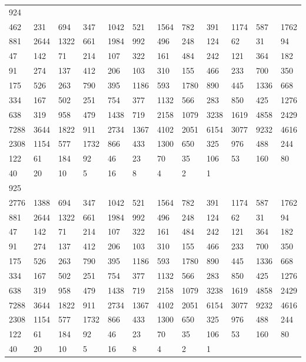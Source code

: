 \begin{longtable}{llllllllllll}
924&&&&&&&&&&&\\
462& 231& 694& 347& 1042& 521& 1564& 782& 391& 1174& 587& 1762\\
881& 2644& 1322& 661& 1984& 992& 496& 248& 124& 62& 31& 94\\
47& 142& 71& 214& 107& 322& 161& 484& 242& 121& 364& 182\\
91& 274& 137& 412& 206& 103& 310& 155& 466& 233& 700& 350\\
175& 526& 263& 790& 395& 1186& 593& 1780& 890& 445& 1336& 668\\
334& 167& 502& 251& 754& 377& 1132& 566& 283& 850& 425& 1276\\
638& 319& 958& 479& 1438& 719& 2158& 1079& 3238& 1619& 4858& 2429\\
7288& 3644& 1822& 911& 2734& 1367& 4102& 2051& 6154& 3077& 9232& 4616\\
2308& 1154& 577& 1732& 866& 433& 1300& 650& 325& 976& 488& 244\\
122& 61& 184& 92& 46& 23& 70& 35& 106& 53& 160& 80\\
40& 20& 10& 5& 16& 8& 4& 2& 1& \\

925&&&&&&&&&&&\\
2776& 1388& 694& 347& 1042& 521& 1564& 782& 391& 1174& 587& 1762\\
881& 2644& 1322& 661& 1984& 992& 496& 248& 124& 62& 31& 94\\
47& 142& 71& 214& 107& 322& 161& 484& 242& 121& 364& 182\\
91& 274& 137& 412& 206& 103& 310& 155& 466& 233& 700& 350\\
175& 526& 263& 790& 395& 1186& 593& 1780& 890& 445& 1336& 668\\
334& 167& 502& 251& 754& 377& 1132& 566& 283& 850& 425& 1276\\
638& 319& 958& 479& 1438& 719& 2158& 1079& 3238& 1619& 4858& 2429\\
7288& 3644& 1822& 911& 2734& 1367& 4102& 2051& 6154& 3077& 9232& 4616\\
2308& 1154& 577& 1732& 866& 433& 1300& 650& 325& 976& 488& 244\\
122& 61& 184& 92& 46& 23& 70& 35& 106& 53& 160& 80\\
40& 20& 10& 5& 16& 8& 4& 2& 1& \\


\end{longtable}
